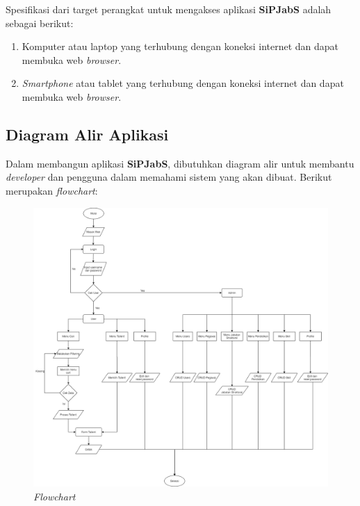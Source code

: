 Spesifikasi dari target perangkat untuk mengakses aplikasi \textbf{SiPJabS} adalah sebagai berikut: 

\begin{enumerate}

\item Komputer atau laptop yang terhubung dengan koneksi internet dan dapat membuka web \textit{browser}.

\item	\textit{Smartphone} atau tablet yang terhubung dengan koneksi internet dan dapat membuka web \textit{browser}.
\end{enumerate}

\subsection{Diagram Alir Aplikasi}

Dalam membangun aplikasi \textbf{SiPJabS}, dibutuhkan diagram alir untuk membantu \textit{developer} dan pengguna dalam memahami sistem yang akan dibuat. Berikut merupakan \textit{flowchart}:

\begin{figure}
	\centering
	\includegraphics[width=1\textwidth]
	{pics/diagram/flowchart.png}
	\caption{\textit{Flowchart}}
	\label{fig:31}
\end{figure}  

\newpage
